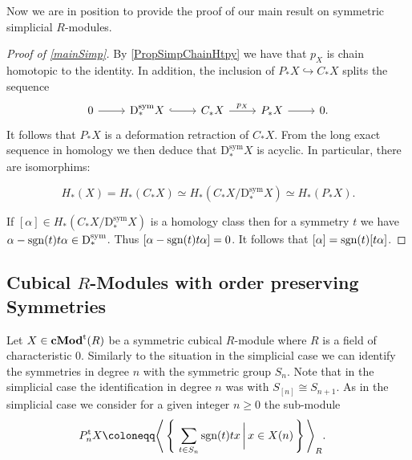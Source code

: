 \documentclass[12pt]{amsart}
\theoremstyle{plain}
\numberwithin{lemma}{\DefaultNumberTheoremWithin}
\numberwithin{claim}{\DefaultNumberTheoremWithin}
\numberwithin{theorem}{\DefaultNumberTheoremWithin}
\numberwithin{corollary}{\DefaultNumberTheoremWithin}
\numberwithin{proposition}{\DefaultNumberTheoremWithin}
\numberwithin{conjecture}{\DefaultNumberTheoremWithin}
\theoremstyle{definition}
\theoremstyle{definition}
\numberwithin{question}{\DefaultNumberTheoremWithin}
\theoremstyle{definition}
\numberwithin{problem}{\DefaultNumberTheoremWithin}
\theoremstyle{remark}
\numberwithin{remark}{\DefaultNumberTheoremWithin}
\theoremstyle{remark}
\numberwithin{example}{\DefaultNumberTheoremWithin}
\def\blt{*}
\def\letbe{\coloneqq}
\def\sgn{\textnormal{sgn}}
\def\trp{\textnormal{t}}
\def\Deg{\mathrm{D}}    %
\def\sDeg{\Deg^{\mathrm{sym}}}  %
\newcommand{\cMod}[2]{\mathbf{cMod}^{\textnormal{#1}}(#2)}  %
\newcommand{\Sym}[1]{S_{[#1]}}
\begin{document}
Now we are in position to provide the 
proof of our main result on 
symmetric simplicial $R$-modules.

\begin{proof}[Proof of \ref{mainSimp}]
    By \ref{PropSimpChainHtpy} we have that $p_X$ is 
    chain homotopic to the identity. In addition, the inclusion of $P_\blt X \hookrightarrow C_\blt X$ 
    splits the sequence
    \[
    \begin{tikzcd}
    0\arrow{r}{}&\sDeg_\blt X\arrow[hook]{r}{} &C_\blt X\arrow{r}{p_X}&P_\blt X \arrow{r}&0.
    \end{tikzcd}
    \]
    It follows that $P_\blt X$ is a deformation 
    retraction of $C_\blt X$. From the long exact 
    sequence in homology we then deduce
    that $\sDeg_\blt X$ is acyclic.
    In particular, there are isomorphims:

    \[
    H_\blt (X) = H_\blt(C_\blt X) \simeq H_\blt (C_\blt X /\sDeg_\blt X ) \simeq H_\blt(P_\blt X).
    \]

    If $[\alpha] \in H_\blt (C_\blt X /\sDeg_\blt X )$ is a homology class then
    for a symmetry $t$ we have $\alpha-\sgn(t) t\alpha \in \sDeg_\blt$. Thus
    $[\alpha-\sgn(t) t \alpha] = 0$. It follows that $[\alpha] = \sgn(t)[t\alpha]$.
    
\end{proof}

\subsection{Cubical \texorpdfstring{$R$}--Modules with order preserving Symmetries} \label{sub:cubical}

Let $X \in \cMod{\trp}{R}$ be a symmetric cubical $R$-module where $R$ is a field of characteristic $0$. Similarly to the 
situation in the simplicial case we can identify the symmetries in degree $n$ with the symmetric group $S_n$.
Note that in the simplicial case the identification 
in degree $n$ was with $\Sym{n} \cong S_{n+1}$.
As in the simplicial case we consider for a given integer $n \geq 0$ the sub-module
\begin{align*}
P_n^{\trp}X\letbe&\Bigg\langle\, \Bigg\{ \,\sum_{t \in S_n} \sgn(t) t x\, \bigg\vert\, x\in X(n)\,\Bigg\} \,\Bigg\rangle_{R}.
\end{align*}
\end{document}
